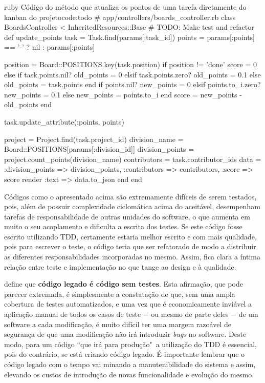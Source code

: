 \begin{mycode}{ruby}%
{Código do método que atualiza os pontos de uma tarefa diretamente do kanban do projeto}{code:todo}
# app/controllers/boards_controller.rb
class BoardsController < InheritedResources::Base
  # TODO: Make test and refactor
  def update_points
    task = Task.find(params[:task_id])
    points = params[:points] == '-' ? nil : params[:points]

    position = Board::POSITIONS.key(task.position)
    if position != 'done'
      score = 0
    else
      if task.points.nil?
        old_points = 0
      elsif task.points.zero?
        old_points = 0.1
      else
        old_points = task.points
      end
      if points.nil?
        new_points = 0
      elsif points.to_i.zero?
        new_points = 0.1
      else
        new_points = points.to_i
      end
      score = new_points - old_points
    end

    task.update_attribute(:points, points)

    project = Project.find(task.project_id)
    division_name = Board::POSITIONS[params[:division_id]]
    division_points = project.count_points(division_name)
    contributors = task.contributor_ids
    data = { :division_points => division_points,
             :contributors => contributors,
             :score => score }
    render :text => data.to_json
  end
end
\end{mycode}

Códigos como o apresentado acima são extremamente difíceis de serem testados, pois, além de possuir complexidade ciclomática acima do aceitável, desempenham tarefas de responsabilidade de outras unidades do software, o que aumenta em muito o seu acoplamento e dificulta a escrita dos testes. Se este código fosse escrito utilizando TDD, certamente estaria melhor escrito e com mais qualidade, pois para escrever o teste, o código teria que ser refatorado de modo a distribuir as diferentes responsabilidades incorporadas no mesmo. Assim, fica clara a íntima relação entre teste e implementação no que tange ao design e à qualidade.

 define que \textbf{código legado é código sem testes}. Esta afirmação, que pode parecer extremada, é simplesmente a constatação de que, sem uma ampla cobertura de testes automatizados, e uma vez que é economicamente inviável a aplicação manual de todos os casos de teste $-$ ou mesmo de parte deles $-$ de um software a cada modificação, é muito difícil ter uma margem razoável de segurança de que uma modificação não irá introduzir \textit{bugs} no software. Deste modo, para um código ``que irá para produção"\ a utilização do TDD é essencial, pois do contrário, se está criando código legado. É importante lembrar que o código legado com o tempo vai minando a manutenibilidade do sistema e assim, elevando os custos de introdução de novas funcionalidade e evolução do mesmo.

